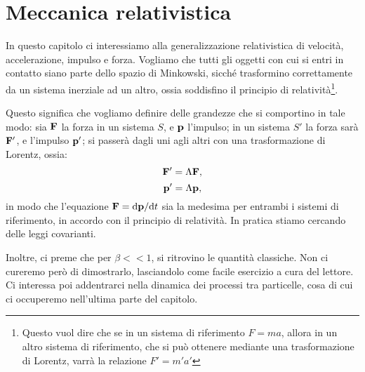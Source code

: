 \chapter{Meccanica relativistica}
\minitoc 
In questo capitolo ci interessiamo alla
generalizzazione relativistica di velocit\`a,
accelerazione, impulso e
forza. Vogliamo che tutti gli oggetti con cui si entri in contatto
siano parte dello spazio di Minkowski, sicch\'e trasformino
correttamente da un sistema inerziale ad un altro, ossia
soddisfino il principio di relativit\`a\footnote{Questo vuol dire che se
in un sistema di riferimento $F = ma$, allora in un altro sistema di
riferimento, che si pu\`o ottenere mediante una trasformazione di
Lorentz, varr\`a la relazione $F' = m' a' $}. 

Questo significa che vogliamo definire delle grandezze che si comportino
in tale modo: sia $\mathbf{F}$ la forza in un sistema $S$, e \(\mathbf{p}\)
l'impulso; in un sistema $S'$ la forza sar\`a $\mathbf{F'}$, e l'impulso
\(\mathbf{p'}\); si passer\`a dagli uni agli altri con una trasformazione di
Lorentz, ossia:
\begin{displaymath}
\mathbf{F}' = \Lambda \mathbf{F}, 
\end{displaymath}
\begin{displaymath}
 \mathbf{p}' = \Lambda \mathbf{p}, 
\end{displaymath}
in modo che l'equazione \(\mathbf{F}= \mathrm{d} \mathbf{p} / \mathrm{d} t\) sia la medesima
per entrambi i sistemi di riferimento, in accordo con il principio di
relativit\`a. In pratica stiamo cercando delle leggi covarianti.

Inoltre, ci preme che per $\beta<<1$, si ritrovino le quantit\`a 
classiche. Non ci cureremo per\`o di dimostrarlo, lasciandolo come facile
esercizio a cura del lettore. Ci interessa poi addentrarci nella
dinamica dei processi tra particelle, cosa di cui ci occuperemo
nell'ultima parte del capitolo.
